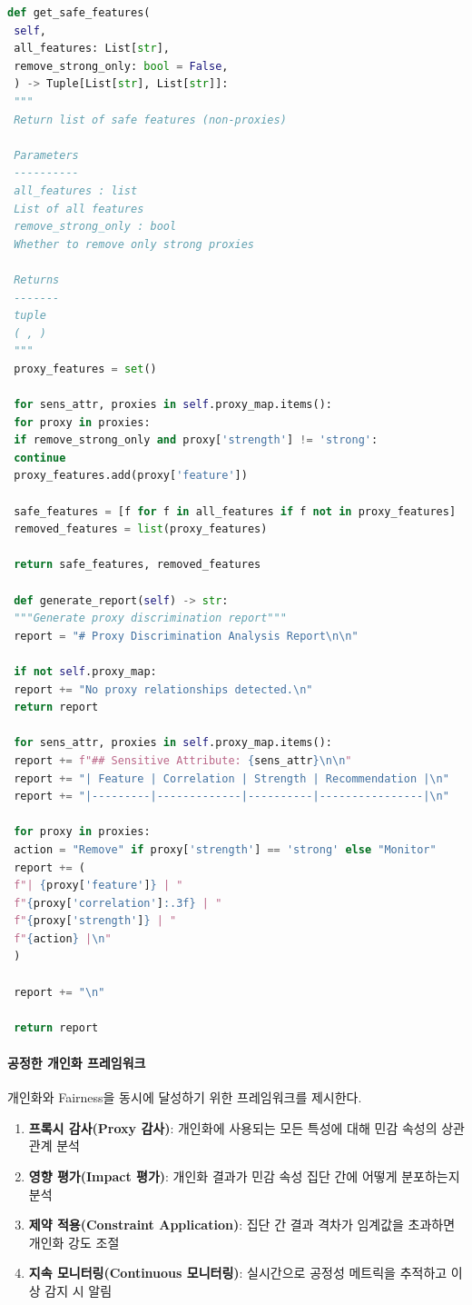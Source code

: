\begin{lstlisting}[language=Python, caption={Proxy Discrimination Detection and Feature Removal}, label={lst:proxy_detection}]
 def get_safe_features(
 self,
 all_features: List[str],
 remove_strong_only: bool = False,
 ) -> Tuple[List[str], List[str]]:
 """
 Return list of safe features (non-proxies)
 
 Parameters
 ----------
 all_features : list
 List of all features
 remove_strong_only : bool
 Whether to remove only strong proxies
 
 Returns
 -------
 tuple
 ( , )
 """
 proxy_features = set()
 
 for sens_attr, proxies in self.proxy_map.items():
 for proxy in proxies:
 if remove_strong_only and proxy['strength'] != 'strong':
 continue
 proxy_features.add(proxy['feature'])
 
 safe_features = [f for f in all_features if f not in proxy_features]
 removed_features = list(proxy_features)
 
 return safe_features, removed_features
 
 def generate_report(self) -> str:
 """Generate proxy discrimination report"""
 report = "# Proxy Discrimination Analysis Report\n\n"
 
 if not self.proxy_map:
 report += "No proxy relationships detected.\n"
 return report
 
 for sens_attr, proxies in self.proxy_map.items():
 report += f"## Sensitive Attribute: {sens_attr}\n\n"
 report += "| Feature | Correlation | Strength | Recommendation |\n"
 report += "|---------|-------------|----------|----------------|\n"
 
 for proxy in proxies:
 action = "Remove" if proxy['strength'] == 'strong' else "Monitor"
 report += (
 f"| {proxy['feature']} | "
 f"{proxy['correlation']:.3f} | "
 f"{proxy['strength']} | "
 f"{action} |\n"
 )
 
 report += "\n"
 
 return report
\end{lstlisting}


\paragraph{공정한 개인화 프레임워크}

개인화와 Fairness을 동시에 달성하기 위한 프레임워크를 제시한다.

\begin{enumerate}
 \item \textbf{프록시 감사(Proxy 감사)}: 
 개인화에 사용되는 모든 특성에 대해 민감 속성의 상관관계 분석
 
 \item \textbf{영향 평가(Impact 평가)}: 
 개인화 결과가 민감 속성 집단 간에 어떻게 분포하는지 분석
 
 \item \textbf{제약 적용(Constraint Application)}: 
 집단 간 결과 격차가 임계값을 초과하면 개인화 강도 조절
 
 \item \textbf{지속 모니터링(Continuous 모니터링)}: 
 실시간으로 공정성 메트릭을 추적하고 이상 감지 시 알림
\end{enumerate}


